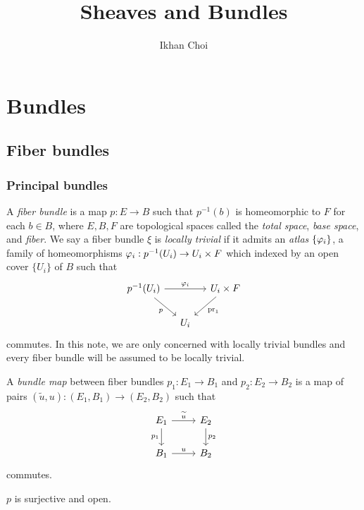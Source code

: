 \documentclass{../../large}
\begin{document}
\title{Sheaves and Bundles}
\author{Ikhan Choi}
\maketitle
\tableofcontents



\part{Bundles}

\chapter{Fiber bundles}


\section{Principal bundles}

\begin{prb}
A \emph{fiber bundle} is a map $p:E\to B$ such that $p^{-1}(b)$ is homeomorphic to $F$ for each $b\in B$, where $E,B,F$ are topological spaces called the \emph{total space}, \emph{base space}, and \emph{fiber}.
We say a fiber bundle $\xi$ is \emph{locally trivial} if it admits an \emph{atlas} $\{\varphi_i\}$, a family of homeomorphisms $\varphi_i:p^{-1}(U_i)\to U_i\times F$ which indexed by an open cover $\{U_i\}$ of $B$ such that
\[\begin{tikzcd}[column sep=small]
p^{-1}(U_i) \ar[swap]{dr}{p}\ar{rr}{\f_i} & & U_i\times F \ar{dl}{\pr_1} \\
& U_i &
\end{tikzcd}\]
commutes.
In this note, we are only concerned with locally trivial bundles and every fiber bundle will be assumed to be locally trivial.

A \emph{bundle map} between fiber bundles $p_1:E_1\to B_1$ and $p_2:E_2\to B_2$ is a map of pairs $(\tilde u,u):(E_1,B_1)\to(E_2,B_2)$ such that
\[\begin{tikzcd}
E_1 \ar[swap]{d}{p_1}\ar{r}{\tilde u} & E_2 \ar{d}{p_2} \\
B_1 \ar{r}{u} & B_2
\end{tikzcd}\]
commutes.
\begin{parts}
\item $p$ is surjective and open.
\end{parts}
\end{prb}
\end{document}
